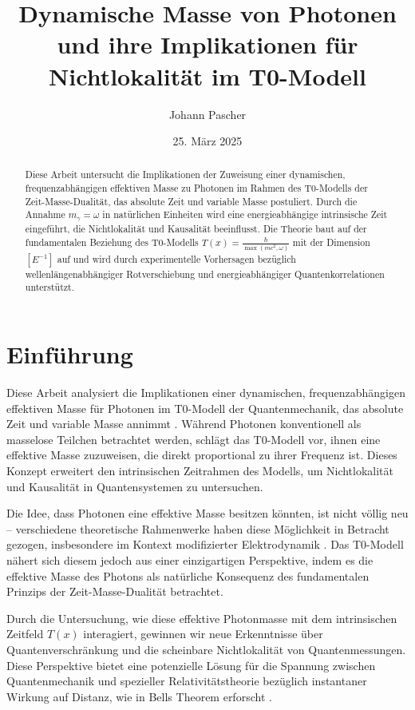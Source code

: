 \documentclass[12pt,a4paper]{article}
\title{Dynamische Masse von Photonen und ihre Implikationen für Nichtlokalität im T0-Modell}
\author{Johann Pascher}
\date{25. März 2025}
\newcommand{\Tfield}{T(x)}
\begin{document}
	
	\maketitle
	
	\begin{abstract}
		Diese Arbeit untersucht die Implikationen der Zuweisung einer dynamischen, frequenzabhängigen effektiven Masse zu Photonen im Rahmen des T0-Modells der Zeit-Masse-Dualität, das absolute Zeit und variable Masse postuliert. Durch die Annahme \(m_\gamma = \omega\) in natürlichen Einheiten wird eine energieabhängige intrinsische Zeit eingeführt, die Nichtlokalität und Kausalität beeinflusst. Die Theorie baut auf der fundamentalen Beziehung des T0-Modells \(\Tfield = \frac{\hbar}{\max(m c^2, \omega)}\) mit der Dimension \([E^{-1}]\) auf und wird durch experimentelle Vorhersagen bezüglich wellenlängenabhängiger Rotverschiebung und energieabhängiger Quantenkorrelationen unterstützt.
	\end{abstract}
	
	\tableofcontents
	\newpage
	
	\section{Einführung}
	Diese Arbeit analysiert die Implikationen einer dynamischen, frequenzabhängigen effektiven Masse für Photonen im T0-Modell der Quantenmechanik, das absolute Zeit und variable Masse annimmt \cite{pascher_zeit_masse_2025, pascher_zeit_2025}. Während Photonen konventionell als masselose Teilchen betrachtet werden, schlägt das T0-Modell vor, ihnen eine effektive Masse zuzuweisen, die direkt proportional zu ihrer Frequenz ist. Dieses Konzept erweitert den intrinsischen Zeitrahmen des Modells, um Nichtlokalität und Kausalität in Quantensystemen zu untersuchen.
	
	Die Idee, dass Photonen eine effektive Masse besitzen könnten, ist nicht völlig neu – verschiedene theoretische Rahmenwerke haben diese Möglichkeit in Betracht gezogen, insbesondere im Kontext modifizierter Elektrodynamik \cite{de_broglie1940, proca1936}. Das T0-Modell nähert sich diesem jedoch aus einer einzigartigen Perspektive, indem es die effektive Masse des Photons als natürliche Konsequenz des fundamentalen Prinzips der Zeit-Masse-Dualität betrachtet.
	
	Durch die Untersuchung, wie diese effektive Photonmasse mit dem intrinsischen Zeitfeld \(\Tfield\) interagiert, gewinnen wir neue Erkenntnisse über Quantenverschränkung und die scheinbare Nichtlokalität von Quantenmessungen. Diese Perspektive bietet eine potenzielle Lösung für die Spannung zwischen Quantenmechanik und spezieller Relativitätstheorie bezüglich instantaner Wirkung auf Distanz, wie in Bells Theorem erforscht \cite{bell}.
	
\end{document}
